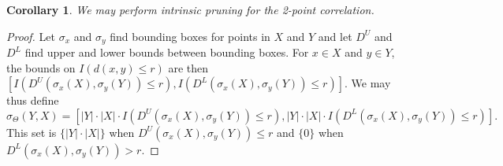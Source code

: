 \documentclass{article}
\newtheorem{corollary} {Corollary}
\newcommand{\GNP}[1][\psi]{{#1}_{\Theta}}
\begin{document}
\begin{corollary}
  We may perform intrinsic pruning for the 2-point correlation.
\end{corollary}
\begin{proof}
  Let $\sigma_x$ and $\sigma_y$ find bounding boxes for points in $X$
  and $Y$ and let $D^{\!U}$ and $D^{\!L}$ find upper and lower bounds
  between bounding boxes.  For $x \in X$ and $y \in Y$, the bounds on
  $I(d(x,y) \leq r)$ are then $\left[
  I(D^{\!U}(\sigma_x(X),\sigma_y(Y)) \leq r),
  I(D^{\!L}(\sigma_x(X),\sigma_y(Y)) \leq r) \right]$.  We may thus
  define
  \[
  \GNP[\sigma](Y,X) = \left[ |Y| \cdot |X| \cdot I(D^{\!U}(\sigma_x(X),\sigma_y(Y)) \leq r), |Y| \cdot |X| \cdot I(D^{\!L}(\sigma_x(X),\sigma_y(Y)) \leq r) \right].
  \]
  This set is $\{|Y| \cdot |X|\}$ when
  $D^{\!U}(\sigma_x(X),\sigma_y(Y)) \leq r$ and $\{0\}$ when
  $D^{\!L}(\sigma_x(X),\sigma_y(Y)) > r$.
\end{proof}

\end{document}
